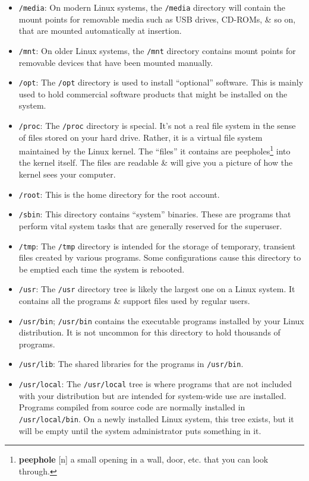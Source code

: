 \documentclass[oneside]{book}
\numberwithin{equation}{section}
\begin{document}
\begin{itemize}
	\item \texttt{/media}: On modern Linux systems, the \texttt{/media} directory will contain the mount points for removable media such as USB drives, CD-ROMs, \& so on, that are mounted automatically at insertion.
	\item \texttt{/mnt}: On older Linux systems, the \texttt{/mnt} directory contains mount points for removable devices that have been mounted manually.
	\item \texttt{/opt}: The \texttt{/opt} directory is used to install ``optional'' software. This is mainly used to hold commercial software products that might be installed on the system.
	\item \texttt{/proc}: The \texttt{/proc} directory is special. It's not a real file system in the sense of files stored on your hard drive. Rather, it is a virtual file system maintained by the Linux kernel. The ``files'' it contains are peepholes\footnote{\textbf{peephole} [n] a small opening in a wall, door, etc. that you can look through.} into the kernel itself. The files are readable \& will give you a picture of how the kernel sees your computer.
	\item \texttt{/root}: This is the home directory for the root account.
	\item \texttt{/sbin}: This directory contains ``system'' binaries. These are programs that perform vital system tasks that are generally reserved for the superuser.
	\item \texttt{/tmp}: The \texttt{/tmp} directory is intended for the storage of temporary, transient files created by various programs. Some configurations cause this directory to be emptied each time the system is rebooted.
	\item \texttt{/usr}: The \texttt{/usr} directory tree is likely the largest one on a Linux system. It contains all the programs \& support files used by regular users.
	\item \texttt{/usr/bin}; \texttt{/usr/bin} contains the executable programs installed by your Linux distribution. It is not uncommon for this directory to hold thousands of programs.
	\item \texttt{/usr/lib}: The shared libraries for the programs in \texttt{/usr/bin}.
	\item \texttt{/usr/local}: The \texttt{/usr/local} tree is where programs that are not included with your distribution but are intended for system-wide use are installed. Programs compiled from source code are normally installed in \texttt{/usr/local/bin}. On a newly installed Linux system, this tree exists, but it will be empty until the system administrator puts something in it.

\end{itemize}
\end{document}
